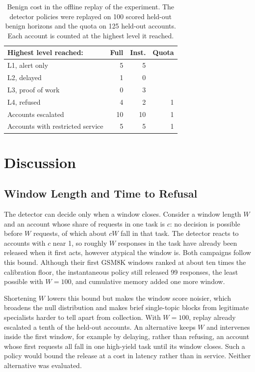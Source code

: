 \documentclass[conference]{IEEEtran}
\begin{document}
\begin{table}[!t]
\centering\footnotesize
\caption{Benign cost in the offline replay of the experiment. The detector policies were replayed on 100 scored held-out benign horizons and the quota on 125 held-out accounts. Each account is counted at the highest level it reached.}
\label{tab:cost}
\begin{tabularx}{\columnwidth}{@{}Yrrr@{}}\toprule
Highest level reached: & Full & Inst. & Quota \\\midrule
L1, alert only & 5 & 5 & \\
L2, delayed & 1 & 0 & \\
L3, proof of work & 0 & 3 & \\
L4, refused & 4 & 2 & 1 \\\midrule
Accounts escalated & 10 & 10 & 1 \\
Accounts with restricted service & 5 & 5 & 1 \\\bottomrule
\end{tabularx}
\end{table}

\section{Discussion}
\label{sec:discussion}
\subsection{Window Length and Time to Refusal}
The detector can decide only when a window closes. Consider a window length $W$ and an account whose share of requests in one task is $c$: no decision is possible before $W$ requests, of which about $cW$ fall in that task. The detector reacts to accounts with $c$ near 1, so roughly $W$ responses in the task have already been released when it first acts, however atypical the window is. Both campaigns follow this bound. Although their first GSM8K windows ranked at about ten times the calibration floor, the instantaneous policy still released 99 responses, the least possible with $W=100$, and cumulative memory added one more window.

Shortening $W$ lowers this bound but makes the window score noisier, which broadens the null distribution and makes brief single-topic blocks from legitimate specialists harder to tell apart from collection. With $W=100$, replay already escalated a tenth of the held-out accounts. An alternative keeps $W$ and intervenes inside the first window, for example by delaying, rather than refusing, an account whose first requests all fall in one high-yield task until its window closes. Such a policy would bound the release at a cost in latency rather than in service. Neither alternative was evaluated.
\end{document}
